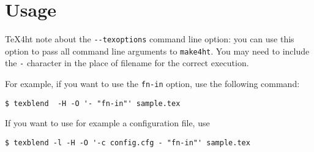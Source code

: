 \section{Usage}
\TeX4ht note about the \verb|--texoptions| command line option: you can use
this option to pass all command line arguments to \verb|make4ht|. You may need
to include the \verb|-| character in the place of filename for the correct
execution.

For example, if you want to use the \verb|fn-in| option, use the following command:

\begin{verbatim}
$ texblend  -H -O '- "fn-in"' sample.tex
\end{verbatim}

If you want to use for example a configuration file, use

\begin{verbatim}
$ texblend -l -H -O '-c config.cfg - "fn-in"' sample.tex
\end{verbatim}
